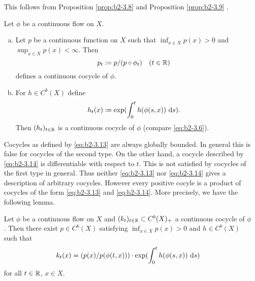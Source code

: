 This follows from Proposition \ref{prop:b2-3.8} and Proposition \ref{prop:b2-3.9} .

\begin{example}\label{ex:b2-3.11}
Let $\phi$ be a continuous flow on $X$.
\begin{enumerate}[a), wide, labelsep=1em, itemindent=\parindent]
\item \label{ex:b2-3.11-1}
Let $p$ be a continuous function on $X$ such that $\inf_{x \in X} p(x) > 0$ and $\sup_{x \in X} p(x) < \infty$.
Then
\begin{equation}\label{eq:b2-3.13}
p_{t} \coloneqq p/(p \circ \phi_{t}) \quad (t \in \mathbb{R})
\end{equation}
defines a continuous cocycle of $\phi$.
\item \label{ex:b2-3.11-2}
For $h \in C^{b}(X)$ define
\begin{equation}\label{eq:b2-3.14}
h_{t}(x) \coloneqq \exp(\int_{0}^{t} h(\phi(s,x))\, \mathop{}\!\mathrm{d}{s}).
\end{equation}
Then $(h_{t})_{t \in \mathbb{R}}$ is a continuous cocycle of $\phi$ (compare \eqref{eq:b2-3.6}).
\end{enumerate}
\end{example}

Cocycles as defined by \eqref{eq:b2-3.13} are always globally bounded.
In general this is false for cocycles of the second type.
On the other hand, a cocycle described by \eqref{eq:b2-3.14} is differentiable with respect to $t$.
This is not satisfied by cocycles of the first type in general.
Thus neither \eqref{eq:b2-3.13} nor \eqref{eq:b2-3.14} gives a description of arbitrary cocycles.
However every positive cocyle is a product of cocycles of the form \eqref{eq:b2-3.13} and \eqref{eq:b2-3.14}.
More precisely, we have the following lemma.

\begin{lemma}\label{lem:b2-3.12}
Let $\phi$ be a continuous flow on $X$ and $(k_{t})_{t \in \mathbb{R}} \subset C^{b}(X)_{+}$ a continuous cocycle of $\phi$.
Then there exist $p \in C^{b}(X)$ satisfying $\inf_{x \in X} p(x) > 0$ and $h \in C^{b}(X)$ such that
\begin{equation}\label{eq:b2-3.15}
k_{t}(x) = (p(x)/p(\phi(t,x))) \cdot \exp(\int_{0}^{t} h(\phi(s,x))\, \mathop{}\!\mathrm{d}{s})
\end{equation}
for all $t \in \mathbb{R}$, $x \in X$.
\end{lemma}

